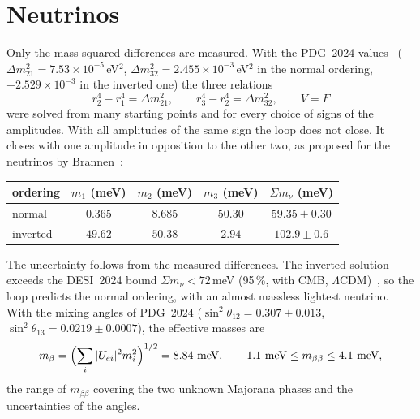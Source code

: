 \documentclass[11pt,a4paper]{article}
\begin{document}
\section{Neutrinos}
Only the mass-squared differences are measured. With the PDG~2024 values~\cite{pdg}
($\Delta m^2_{21}=7.53\times10^{-5}$\,eV$^2$, $\Delta m^2_{32}=2.455\times10^{-3}$\,eV$^2$ in the normal ordering,
$-2.529\times10^{-3}$ in the inverted one) the three relations
\begin{equation}
  r_2^4-r_1^4=\Delta m^2_{21},\qquad r_3^4-r_2^4=\Delta m^2_{32},\qquad V=F
\end{equation}
were solved from many starting points and for every choice of signs of the amplitudes. With all amplitudes of the same
sign the loop does not close. It closes with one amplitude in opposition to the other two, as proposed for the
neutrinos by Brannen~\cite{brannen}:
\begin{center}
\begin{tabular}{lcccc}
\toprule
ordering & $m_1$ (meV) & $m_2$ (meV) & $m_3$ (meV) & $\Sigma m_\nu$ (meV) \\
\midrule
normal & $0.365$ & $8.685$ & $50.30$ & $59.35\pm0.30$ \\
inverted & $49.62$ & $50.38$ & $2.94$ & $102.9\pm0.6$ \\
\bottomrule
\end{tabular}
\end{center}
The uncertainty follows from the measured differences. The inverted solution exceeds the DESI~2024 bound
$\Sigma m_\nu<72$\,meV (95\,\%, with CMB, $\Lambda$CDM)~\cite{desi}, so the loop predicts the normal ordering, with an
almost massless lightest neutrino. With the mixing angles of PDG~2024 ($\sin^2\theta_{12}=0.307\pm0.013$,
$\sin^2\theta_{13}=0.0219\pm0.0007$), the effective masses are
\begin{equation}
  m_\beta=\Bigl(\sum_i|U_{ei}|^2m_i^2\Bigr)^{1/2}=8.84\ \text{meV},\qquad
  1.1\ \text{meV}\le m_{\beta\beta}\le4.1\ \text{meV},
\end{equation}
the range of $m_{\beta\beta}$ covering the two unknown Majorana phases and the uncertainties of the angles.
\end{document}
